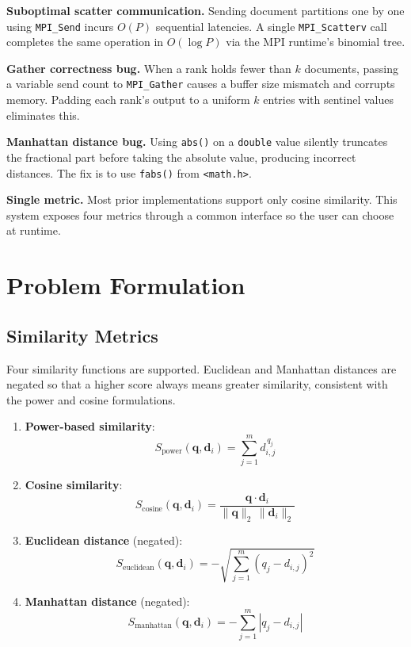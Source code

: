 \documentclass[12pt,a4paper]{article}
\begin{document}
\textbf{Suboptimal scatter communication.} Sending document partitions
one by one using \texttt{MPI\_Send} incurs $O(P)$ sequential latencies.
A single \texttt{MPI\_Scatterv} call completes the same operation in
$O(\log P)$ via the MPI runtime's binomial tree.

\textbf{Gather correctness bug.} When a rank holds fewer than $k$
documents, passing a variable send count to \texttt{MPI\_Gather} causes
a buffer size mismatch and corrupts memory. Padding each rank's output
to a uniform $k$ entries with sentinel values eliminates this.

\textbf{Manhattan distance bug.} Using \texttt{abs()} on a
\texttt{double} value silently truncates the fractional part before
taking the absolute value, producing incorrect distances. The fix is to
use \texttt{fabs()} from \texttt{<math.h>}.

\textbf{Single metric.} Most prior implementations support only cosine
similarity. This system exposes four metrics through a common interface
so the user can choose at runtime.

\clearpage
\section{Problem Formulation}

\subsection{Similarity Metrics}

Four similarity functions are supported. Euclidean and Manhattan
distances are negated so that a higher score always means greater
similarity, consistent with the power and cosine formulations.

\begin{enumerate}
\item \textbf{Power-based similarity}:
\begin{equation}
    S_{\text{power}}(\mathbf{q},\mathbf{d}_i)
    = \sum_{j=1}^{m} d_{i,j}^{\,q_j}
\end{equation}

\item \textbf{Cosine similarity}:
\begin{equation}
    S_{\text{cosine}}(\mathbf{q},\mathbf{d}_i)
    = \frac{\mathbf{q}\cdot\mathbf{d}_i}
           {\|\mathbf{q}\|_2\,\|\mathbf{d}_i\|_2}
\end{equation}

\item \textbf{Euclidean distance} (negated):
\begin{equation}
    S_{\text{euclidean}}(\mathbf{q},\mathbf{d}_i)
    = -\sqrt{\sum_{j=1}^{m}(q_j-d_{i,j})^2}
\end{equation}

\item \textbf{Manhattan distance} (negated):
\begin{equation}
    S_{\text{manhattan}}(\mathbf{q},\mathbf{d}_i)
    = -\sum_{j=1}^{m}|q_j-d_{i,j}|
\end{equation}
\end{enumerate}
\end{document}
